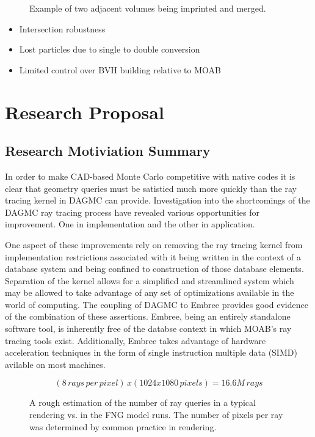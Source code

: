 \documentclass[10pt, a4paper]{article}
\begin{document}
\begin{figure}
  \caption{Example of two adjacent volumes being imprinted and merged.}
\end{figure}


\begin{itemize}
\item Intersection robustness
\item Lost particles due to single to double conversion
\item Limited control over BVH building relative to MOAB
\end{itemize}

\section{Research Proposal}%

\subsection{Research Motiviation Summary}%
In order to make CAD-based Monte Carlo competitive with native codes it is clear that geometry queries must be satistied much more quickly than the ray tracing kernel in DAGMC can provide. Investigation into the shortcomings of the DAGMC ray tracing process have revealed various opportunities for improvement. One in implementation and the other in application.

One aspect of these improvements rely on removing the ray tracing kernel from implementation restrictions associated with it being written in the context of a database system and being confined to construction of those database elements. Separation of the kernel allows for a simplified and streamlined system which may be allowed to take advantage of any set of optimizations available in the world of computing. The coupling of DAGMC to Embree provides good evidence of the combination of these assertions. Embree, being an entirely standalone software tool, is inherently free of the databse context in which MOAB's ray tracing tools exist. Additionally, Embree takes advantage of hardware acceleration techniques in the form of single instruction multiple data (SIMD) avilable on most machines.


\begin{figure}[H]
  \centering
  \caption{A rough estimation of the number of ray queries in a typical rendering vs. in the FNG model runs. The number of pixels per ray was determined by common practice in rendering.}
  \label{render_ray_estimate}
  \[ (8\, rays\, per\, pixel)\, x (1024 x 1080\, pixels) = 16.6M \, rays \]
\end{figure}
\end{document}
